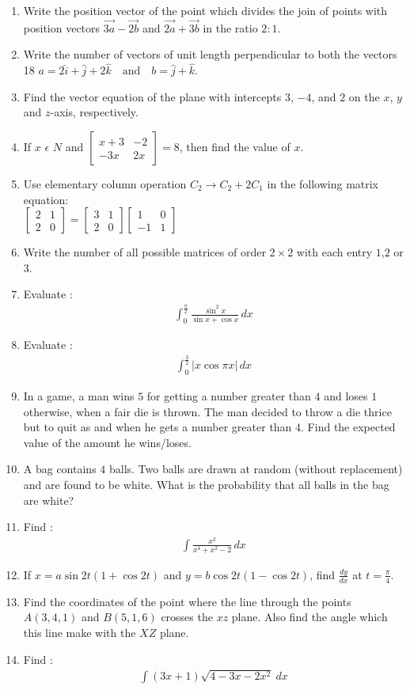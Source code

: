 \documentclass[12pt,-letter paper]{article}
\providecommand{\myvec}[1]{\ensuremath{\begin{bmatrix}#1\end{bmatrix}}}
\begin{document}
\begin{enumerate}
\item Write the position vector of the point which divides the join of points with position vectors $ \overrightarrow{3a} -\overrightarrow{2b} $ and $ \overrightarrow{2a}+\overrightarrow{3b} $ in the ratio $ 2:1 $.
\item Write the number of vectors of unit length perpendicular to both the vectors
18 $a = 2\hat{i} + \hat{j} + 2\hat{k} \quad \text{and} \quad b = \hat{j} + \hat{k}$.
\item Find the vector equation of the plane with intercepts $3$, $- 4$, and $2$ on the $x$, $y$ and $z$-axis, respectively.
\item If $x$ $\epsilon$ $ N $ and $\myvec{x+3 & -2\\ -3x & 2x}=8$, then find the value of $x$.
\item Use elementary column operation $C_2 \rightarrow C_{2}+2C_{1}$ in the following  matrix  equation:\\ $\myvec{2 & 1 \\     2 & 0}=\myvec{3 & 1 \\ 2 & 0}\myvec{1 & 0 \\ -1 & 1}$
\item  Write the number of all possible matrices of order \(2\times 2\) with each entry $1$,$2$ or $3$.
\item Evaluate : 
\begin{align*} 
\int_{0}^{\frac{\pi}{2}} \frac{\sin^2 x}{\sin x + \cos x} \, dx
\end{align*}
\item Evaluate :
\begin{align*}
\int_{0}^\frac{3}{2}\left| x \cos \pi x \right| \, dx
\end{align*}
\item In a game, a man wins  \rupee   $ 5$  for getting a number greater than $4$ and loses  \rupee $ 1$ otherwise, when a fair die is thrown. The man decided to throw a die thrice but to quit as and when he gets a number greater than $4$. Find the     expected value of the amount he wins/loses.
\item  A bag contains $4$ balls. Two balls are drawn at random (without replacement) and are found to be white. What     is the probability that all balls in the bag are white?
\item Find :                    
\begin{align*}                                    
\int \frac{x^2}{x^4 + x^2 - 2} \, dx   
\end{align*}
\item If $ x=a \sin 2t (1 + \cos 2t)$ and $ y=b \cos 2t (1 - \cos 2t)$, find $\frac{dy}{dx}$ at $ t = \frac{\pi}{4}$.
\item Find the coordinates of the point where the line through the points $ A(3,4,1) $ and $B(5,1,6)$ crosses the $xz$ plane. Also find the angle which this line make with the $XZ$ plane.
\item Find :
\begin{align*}  
\int (3x+1)\sqrt {4-3x-2x^2} \ dx    
\end{align*}


\end{enumerate}
\end{document}
